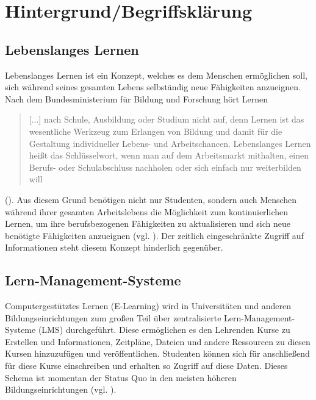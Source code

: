 \chapter{Hintergrund/Begriffsklärung} 
\label{chapter:Kapitel2}

\section{Lebenslanges Lernen}
Lebenslanges Lernen ist ein Konzept, welches es dem Menschen ermöglichen soll, sich während seines gesamten Lebens selbständig neue Fähigkeiten anzueignen. Nach dem Bundesministerium für Bildung und Forschung hört Lernen \begin{quotation}
 [...] nach Schule, Ausbildung oder Studium nicht auf, denn Lernen ist das wesentliche Werkzeug zum Erlangen von Bildung und damit für die Gestaltung individueller Lebens- und Arbeitschancen. Lebenslanges Lernen heißt das Schlüsselwort, wenn man auf dem Arbeitsmarkt mithalten, einen Berufs- oder Schulabschluss nachholen oder sich einfach nur weiterbilden will 
\end{quotation} (\cite{BMBF2008}).
Aus diesem Grund benötigen nicht nur Studenten, sondern auch Menschen während ihrer gesamten Arbeitslebens die Möglichkeit zum kontinuierlichen Lernen, um ihre berufsbezogenen Fähigkeiten zu aktualisieren und sich neue benötigte Fähigkeiten anzueignen (vgl. \cite{Attwell2007}). Der zeitlich eingeschränkte Zugriff auf Informationen steht diesem Konzept hinderlich gegenüber.

\section{Lern-Management-Systeme}\label{section:lms}
Computergestütztes Lernen (E-Learning) wird in Universitäten und anderen Bildungseinrichtungen zum großen Teil über zentralisierte Lern-Management-Systeme (LMS) durchgeführt. Diese ermöglichen es den Lehrenden Kurse zu Erstellen und Informationen, Zeitpläne, Dateien und andere Ressourcen zu diesen Kursen hinzuzufügen und veröffentlichen. Studenten können sich für anschließend für diese Kurse einschreiben und erhalten so Zugriff auf diese Daten. Dieses Schema ist momentan der Status Quo in den meisten höheren Bildungseinrichtungen (vgl. \cite{Mott2010}). 

